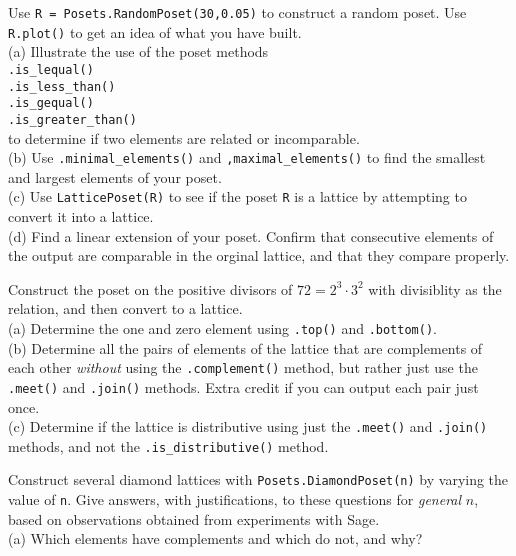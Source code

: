\begin{sageverbatim}\end{sageverbatim}
%
%
Use  \verb?R = Posets.RandomPoset(30,0.05)? to construct a random poset.  Use \verb?R.plot()? to get an idea of what you have built.\\
%
(a) Illustrate the use of the poset methods\\
\verb?.is_lequal()?\\
\verb?.is_less_than()?\\
\verb?.is_gequal()?\\
\verb?.is_greater_than()?\\
to determine if two elements are related or incomparable.\\
%
(b) Use \verb?.minimal_elements()? and \verb?,maximal_elements()? to find the smallest and largest elements of your poset.\\
%
(c) Use \verb?LatticePoset(R)? to see if the poset \verb?R? is a lattice by attempting to convert it into a lattice.\\
%
(d) Find a linear extension of your poset.  Confirm that consecutive elements of the output are comparable in the orginal lattice, and that they compare properly.
\begin{sageverbatim}\end{sageverbatim}
%
%
Construct the poset on the positive divisors of $72=2^3\cdot 3^2$ with divisiblity as the relation, and then convert to a lattice.\\
%
(a) Determine the one and zero element using \verb?.top()? and \verb?.bottom()?.\\
%
(b) Determine all the pairs of elements of the lattice that are complements of each other \emph{without} using the \verb?.complement()? method, but rather just use the \verb?.meet()? and \verb?.join()? methods.  Extra credit if you can output each pair just once.\\
%
(c) Determine if the lattice is distributive using just the \verb?.meet()? and \verb?.join()? methods, and not the \verb?.is_distributive()? method.
\begin{sageverbatim}\end{sageverbatim}
%
%
Construct several diamond lattices with \verb?Posets.DiamondPoset(n)? by varying the value of \verb?n?.  Give answers, with justifications, to these questions for \emph{general} $n$, based on observations obtained from experiments with Sage.\\
%
(a) Which elements have complements and which do not, and why?\\
